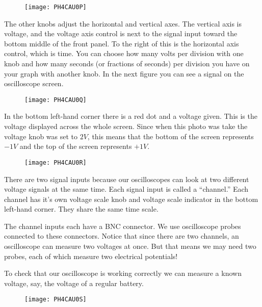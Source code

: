 \begin{figure}[h!]
	\centering
    \texttt{[image: PH4CAU0P]}
\end{figure}

The other knobs adjust the horizontal and vertical axes. The vertical axis is voltage, and the voltage axis control is next to the signal input toward the bottom middle of the front panel. To the right of this is the horizontal axis control, which is time. You can choose how many volts per division with one knob and how many seconds (or fractions of seconds) per division you have on your graph with another knob. In the next figure you can see a signal on the oscilloscope screen. 

\begin{figure}[h!]
	\centering
	\texttt{[image: PH4CAU0Q]}
\end{figure}

In the bottom left-hand corner there is a red dot and a voltage given. This is the voltage displayed across the whole screen. Since when this photo was take the voltage knob was set to 
$2\unit{V}$, this means that the bottom of the screen represents $-1\unit{V}$ and the top of the screen represents $+1\unit{V}.$ 

\begin{figure}[h!]
	\centering
	\texttt{[image: PH4CAU0R]}
\end{figure}

There are two signal inputs because our oscilloscopes can look at two different voltage signals at the same time. Each signal input is called a ``channel.'' Each channel has it's own voltage scale knob and voltage scale indicator in the bottom left-hand corner. They share the same time scale.

The channel inputs each have a BNC connector. We use oscilloscope probes connected to these connectors. Notice that since there are two channels, an oscilloscope can measure two voltages at once. But that means we may need two probes, each of which measure two electrical potentials!

To check that our oscilloscope is working correctly we can measure a known voltage, say, the voltage of a regular battery.

\begin{figure}[h!]
	\centering
	\texttt{[image: PH4CAU0S]}
\end{figure}

